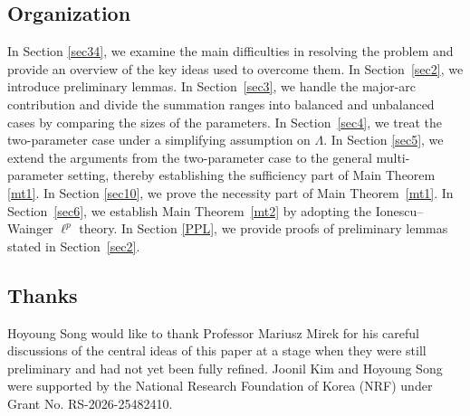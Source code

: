 \documentclass[11 pt,letterpaper]{amsart}
\theoremstyle{plain}
\theoremstyle{definition}
\theoremstyle{remark} \theoremstyle{exam} \theoremstyle{ob}
\numberwithin{equation}{section}
\begin{document}
\subsection{Organization}
In Section \ref{sec34}, we examine the main difficulties in resolving the problem and provide an overview of the key ideas used to overcome them. In Section~\ref{sec2}, we introduce preliminary lemmas. In Section~\ref{sec3}, we handle the major-arc contribution and divide the
summation ranges into balanced and unbalanced cases by comparing
the sizes of the parameters. In Section~\ref{sec4}, we treat the two-parameter case under a simplifying assumption on $\Lambda$.
In Section \ref{sec5}, we extend the arguments from the two-parameter case to the general multi-parameter setting, thereby establishing the sufficiency part of Main Theorem \ref{mt1}.
In Section \ref{sec10}, we prove the necessity part of Main Theorem~\ref{mt1}.
In Section~\ref{sec6}, we establish Main Theorem~\ref{mt2} by adopting the Ionescu–Wainger $\ell^{p}$ theory.
In  Section \ref{PPL}, we provide proofs of preliminary lemmas stated in Section~\ref{sec2}.





\subsection{Thanks}
Hoyoung Song would like to thank Professor Mariusz Mirek for his careful discussions of the central ideas of this paper at a stage when they were still preliminary and had not yet been fully refined.
Joonil Kim and Hoyoung Song were supported by the National Research Foundation of Korea (NRF) under Grant No. RS-2026-25482410.
\end{document}
